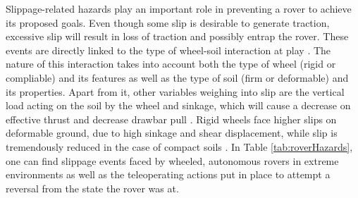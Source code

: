 Slippage-related hazards play an important role in preventing a rover to achieve its proposed goals. Even though some slip is desirable to generate traction, excessive slip will result in loss of traction \cite{Wong2001} and possibly entrap the rover. These events are directly linked to the type of wheel-soil interaction at play \cite{Genta2012}. The nature of this interaction takes into account both the type of wheel (rigid or compliable) and its features as well as the type of soil (firm or deformable) and its properties. Apart from it, other variables weighing into slip are the vertical load acting on the soil by the wheel and sinkage, which will cause a decrease on effective thrust and decrease drawbar pull \cite{wong:terramechanics, wong:performance}. Rigid wheels face higher slips on deformable ground, due to high sinkage and shear displacement, while slip is tremendously reduced in the case of compact soils \cite{Green1971}. In Table \ref{tab:roverHazards}, one can find slippage events faced by wheeled, autonomous rovers in extreme environments as well as the teleoperating actions put in place to attempt a reversal from the state the rover was at.

